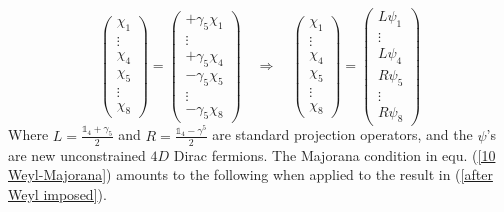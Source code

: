 \newpage
%
%
\begin{equation}\label{after Weyl imposed}
\left( \begin{array}{c}
\chi_1 \\
\vdots \\
\chi_4 \\
\chi_5 \\
\vdots \\
\chi_8
\end{array} \right)
=
%
\left( \begin{array}{c}
+ \gamma_5 \chi_1 \\
\vdots \\
+ \gamma_5 \chi_4 \\
- \gamma_5 \chi_5 \\
\vdots \\
- \gamma_5 \chi_8
\end{array} \right)
%
\quad \Rightarrow \quad
%
\left( \begin{array}{c}
\chi_1 \\
\vdots \\
\chi_4 \\
\chi_5 \\
\vdots \\
\chi_8
\end{array} \right)
%
=
%
\left( \begin{array}{c}
L \psi_1 \\
\vdots \\
L \psi_4 \\
R \psi_5 \\
\vdots \\
R \psi_8
\end{array} \right)
\end{equation}
%
%
Where $L = \frac{\mathbb{1}_4 + \gamma_5}{2}$ and $R = \frac{\mathbb{1}_4 - \gamma^5}{2}$ are standard projection operators, and the $\psi$'s are new unconstrained $4D$ Dirac fermions. The Majorana condition in equ. (\ref{10 Weyl-Majorana}) amounts to the following when applied to the result in (\ref{after Weyl imposed}).
%
%

